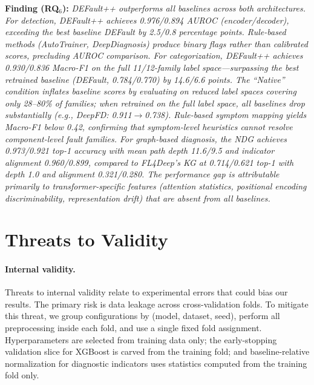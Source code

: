 \begin{tcolorbox}[colback=gray!3, colframe=gray!50, boxrule=0.3pt, left=4pt, right=4pt, top=3pt, bottom=3pt]
\textbf{Finding (RQ$_6$):} \textit{DEFault++ outperforms all baselines across both architectures. For detection, DEFault++ achieves 0.976/0.894 AUROC (encoder/decoder), exceeding the best baseline DEFault by 2.5/0.8 percentage points. Rule-based methods (AutoTrainer, DeepDiagnosis) produce binary flags rather than calibrated scores, precluding AUROC comparison. For categorization, DEFault++ achieves 0.930/0.836 Macro-F1 on the full 11/12-family label space---surpassing the best retrained baseline (DEFault, 0.784/0.770) by 14.6/6.6 points. The ``Native'' condition inflates baseline scores by evaluating on reduced label spaces covering only 28--80\% of families; when retrained on the full label space, all baselines drop substantially (e.g., DeepFD: 0.911$\to$0.738). Rule-based symptom mapping yields Macro-F1 below 0.42, confirming that symptom-level heuristics cannot resolve component-level fault families. For graph-based diagnosis, the NDG achieves 0.973/0.921 top-1 accuracy with mean path depth 11.6/9.5 and indicator alignment 0.960/0.899, compared to FL4Deep's KG at 0.714/0.621 top-1 with depth 1.0 and alignment 0.321/0.280. The performance gap is attributable primarily to transformer-specific features (attention statistics, positional encoding discriminability, representation drift) that are absent from all baselines.}
\end{tcolorbox}

\section{Threats to Validity}
\label{sec:defaultpp_threats}

\paragraph{Internal validity.}
Threats to internal validity relate to experimental errors that could bias our results. The primary risk is data leakage across cross-validation folds. To mitigate this threat, we group configurations by (model, dataset, seed), perform all preprocessing inside each fold, and use a single fixed fold assignment. Hyperparameters are selected from training data only; the early-stopping validation slice for XGBoost is carved from the training fold; and baseline-relative normalization for diagnostic indicators uses statistics computed from the training fold only.

